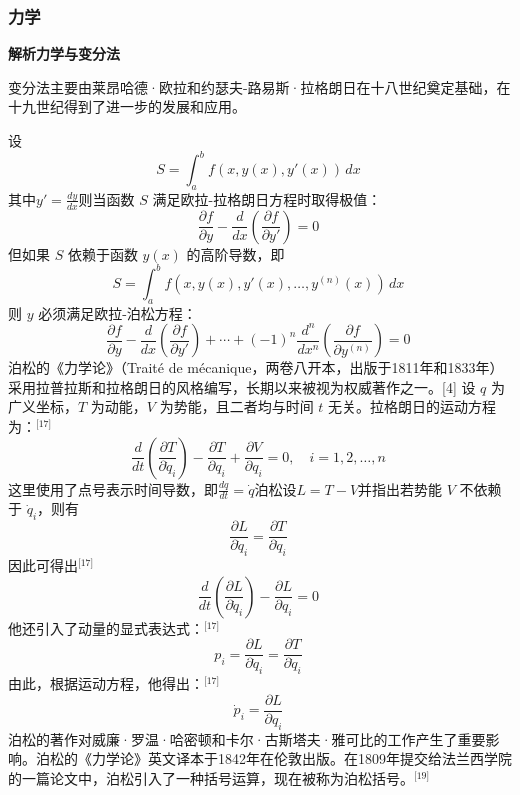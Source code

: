 \subsubsection{力学}
\textbf{解析力学与变分法}

变分法主要由莱昂哈德·欧拉和约瑟夫-路易斯·拉格朗日在十八世纪奠定基础，在十九世纪得到了进一步的发展和应用。

设
$$
S = \int_a^b f(x, y(x), y'(x))\,dx~
$$
其中$y' = \frac{dy}{dx}$则当函数 $S$ 满足欧拉-拉格朗日方程时取得极值：
$$
\frac{\partial f}{\partial y} - \frac{d}{dx} \left( \frac{\partial f}{\partial y'} \right) = 0~
$$
但如果 $S$ 依赖于函数 $y(x)$ 的高阶导数，即
$$
S = \int_a^b f\left(x, y(x), y'(x), \dots, y^{(n)}(x)\right)\,dx~
$$
则 $y$ 必须满足欧拉-泊松方程：
$$
\frac{\partial f}{\partial y} - \frac{d}{dx} \left( \frac{\partial f}{\partial y'} \right) + \cdots + (-1)^n \frac{d^n}{dx^n} \left( \frac{\partial f}{\partial y^{(n)}} \right) = 0~
$$
泊松的《力学论》（Traité de mécanique，两卷八开本，出版于1811年和1833年）采用拉普拉斯和拉格朗日的风格编写，长期以来被视为权威著作之一。[4] 设
$q$ 为广义坐标，$T$ 为动能，$V$ 为势能，且二者均与时间 $t$ 无关。拉格朗日的运动方程为：\(^\text{[17]}\)
$$
\frac{d}{dt} \left( \frac{\partial T}{\partial \dot{q}_i} \right) - \frac{\partial T}{\partial q_i} + \frac{\partial V}{\partial q_i} = 0, \quad i = 1, 2, \dots, n~
$$
这里使用了点号表示时间导数，即$\frac{dq}{dt} = \dot{q}$泊松设$L = T - V$并指出若势能 $V$ 不依赖于 $\dot{q}_i$，则有
$$
\frac{\partial L}{\partial \dot{q}_i} = \frac{\partial T}{\partial \dot{q}_i}~
$$
因此可得出\(^\text{[17]}\)
$$
\frac{d}{dt} \left( \frac{\partial L}{\partial \dot{q}_i} \right) - \frac{\partial L}{\partial q_i} = 0~
$$
他还引入了动量的显式表达式：\(^\text{[17]}\)
$$
p_i = \frac{\partial L}{\partial \dot{q}_i} = \frac{\partial T}{\partial \dot{q}_i}~
$$
由此，根据运动方程，他得出：\(^\text{[17]}\)
$$
\dot{p}_i = \frac{\partial L}{\partial q_i}~
$$
泊松的著作对威廉·罗温·哈密顿和卡尔·古斯塔夫·雅可比的工作产生了重要影响。泊松的《力学论》英文译本于1842年在伦敦出版。在1809年提交给法兰西学院的一篇论文中，泊松引入了一种括号运算，现在被称为泊松括号。\(^\text{[19]}\)


